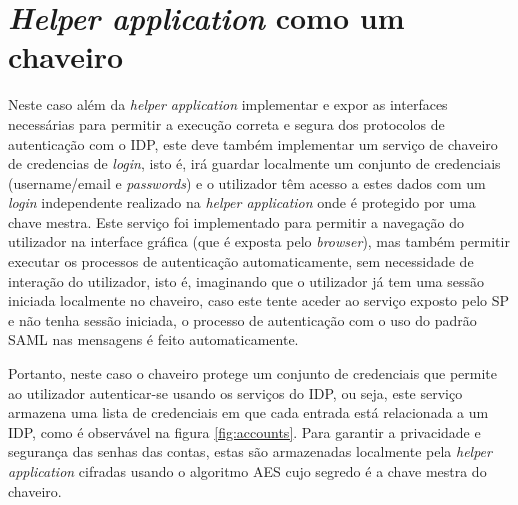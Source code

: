 \section{\textit{Helper application} como um chaveiro}
\label{chaveiro}

\quad Neste caso além da  \textit{helper application} implementar e expor as interfaces necessárias para permitir a execução correta e segura dos protocolos de autenticação com o IDP, este deve também implementar um serviço de chaveiro de credencias de \textit{login}, isto é, irá guardar localmente um conjunto de credenciais (username/email e \textit{passwords}) e o utilizador têm acesso a estes dados com um \textit{login} independente realizado na \textit{helper application} onde é protegido por uma chave mestra. Este serviço foi implementado para permitir a navegação do utilizador na interface gráfica (que é exposta pelo \textit{browser}), mas também permitir executar os processos de autenticação automaticamente, sem necessidade de interação do utilizador, isto é, imaginando que o utilizador já tem uma sessão iniciada localmente no chaveiro, caso este tente aceder ao serviço exposto pelo SP e não tenha sessão iniciada, o processo de autenticação com o uso do padrão SAML nas mensagens é feito automaticamente. 

\quad Portanto, neste caso o chaveiro protege um conjunto de credenciais que permite ao utilizador autenticar-se usando os serviços do IDP, ou seja, este serviço armazena uma lista de credenciais em que cada entrada está relacionada a um IDP, como é observável na figura \ref{fig:accounts}. Para garantir a privacidade e segurança das senhas das contas, estas são armazenadas localmente pela \textit{helper application} cifradas usando o algoritmo AES cujo segredo é a chave mestra do chaveiro.

